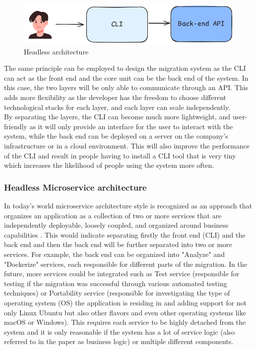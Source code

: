 \documentclass[twocolumn]{article}
\begin{document}
\begin{figure}[H]
    \centering
    \includegraphics[width=\linewidth]{images/headless-architecture.png}
    \caption{Headless architecture}
    \label{fig:headless-architecture}
\end{figure}

The same principle can be employed to design the migration system as the CLI can act as the front end and the core unit can be the back end of the system. In this case, the two layers will be only able to communicate through an API. This adds more flexibility as the developer has the freedom to choose different technological stacks for each layer, and each layer can scale independently. \\

By separating the layers, the CLI can become much more lightweight, and user-friendly as it will only provide an interface for the user to interact with the system, while the back end can be deployed on a server on the company's infrastructure or in a cloud environment. This will also improve the performance of the CLI and result in people having to install a CLI tool that is very tiny which increases the likelihood of people using the system more often.

\subsubsection{Headless Microservice architecture}
In today's world microservice architecture style is recognized as an approach that organizes an application as a collection of two or more services that are independently deployable, loosely coupled, and organized around business capabilities \cite{Thönes-2015}. This would indicate separating firstly the front end (CLI) and the back end and then the back end will be further separated into two or more services. For example, the back end can be organized into "Analyze" and "Dockerize" services, each responsible for different parts of the migration. In the future, more services could be integrated such as Test service (responsible for testing if the migration was successful through various automated testing techniques) or Portability service (responsible for investigating the type of operating system (OS) the application is residing in and adding support for not only Linux Ubuntu but also other flavors and even other operating systems like macOS or Windows). This requires each service to be highly detached from the system and it is only reasonable if the system has a lot of service logic (also referred to in the paper as business logic) or multiple different components. \\
\end{document}
